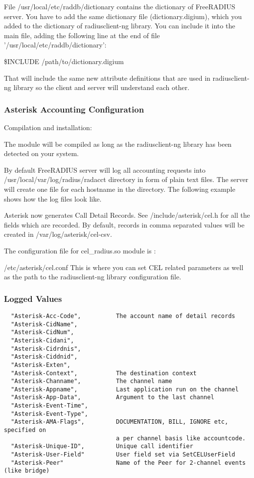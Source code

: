 	File /usr/local/etc/raddb/dictionary contains the dictionary of 
	FreeRADIUS server. You have to add the same dictionary file 
	(dictionary.digium), which you added to the dictionary of radiusclient-ng
	library. You can include it into the main file, adding the following line at the
	end of file '/usr/local/etc/raddb/dictionary':

	\$INCLUDE /path/to/dictionary.digium

	That will include the same new attribute definitions that are used 
	in radiusclient-ng library so the client and server will understand each 
	other. 


\subsubsection{Asterisk Accounting Configuration}

	Compilation and installation:

        The module will be compiled as long as the radiusclient-ng
        library has been detected on your system.

	By default FreeRADIUS server will log all accounting requests into 
	/usr/local/var/log/radius/radacct directory in form of plain text files. 
	The server will create one file for each hostname in the directory. The 
	following example shows how the log files look like. 

	Asterisk now generates Call Detail Records. See /include/asterisk/cel.h
	for all the fields which are recorded. By default, records in comma 
	separated values will be created in /var/log/asterisk/cel-csv. 

	The configuration file for cel\_radius.so module is :

        /etc/asterisk/cel.conf 
	This is where you can set CEL related parameters as well as the path to
	the radiusclient-ng library configuration file.


\subsubsection{Logged Values}
\begin{verbatim}
  "Asterisk-Acc-Code",          The account name of detail records
  "Asterisk-CidName",
  "Asterisk-CidNum",
  "Asterisk-Cidani",
  "Asterisk-Cidrdnis",
  "Asterisk-Ciddnid",
  "Asterisk-Exten",
  "Asterisk-Context",           The destination context
  "Asterisk-Channame",          The channel name
  "Asterisk-Appname",	        Last application run on the channel 
  "Asterisk-App-Data",          Argument to the last channel 
  "Asterisk-Event-Time",        
  "Asterisk-Event-Type",        
  "Asterisk-AMA-Flags",       	DOCUMENTATION, BILL, IGNORE etc, specified on 
                                a per channel basis like accountcode. 
  "Asterisk-Unique-ID",         Unique call identifier 
  "Asterisk-User-Field"	        User field set via SetCELUserField 
  "Asterisk-Peer"	            Name of the Peer for 2-channel events (like bridge)
  
\end{verbatim}
